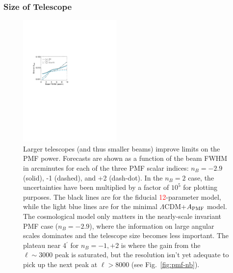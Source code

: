 \documentclass[apj]{emulateapj}
\newcommand{\apmf}{\ensuremath{A_{\rm PMF}}}
\newcommand{\lcdm}{\ensuremath{\Lambda}CDM}
\newcommand{\changed}[1]{\textcolor{Red}{#1}}
\begin{document}
\subsubsection{Size of Telescope }


\begin{figure}[htb]\centering
\includegraphics[width=0.45\textwidth,clip,trim={2.cm 12.5cm 11cm 7.5cm}]{pmf_beam.pdf}
  \caption[]{ \label{fig:beam}
 Larger telescopes (and thus smaller beams) improve limits on the PMF power. 
 Forecasts are shown as a function of the beam FWHM in arcminutes for each of the three PMF scalar indices: $n_B = -2.9$ (solid), -1 (dashed), and +2 (dash-dot). 
   In the $n_B=2$ case, the uncertainties have been multiplied by a factor of $10^5$ for plotting purposes. 
  The black lines are for the fiducial \changed{12}-parameter model, while the light blue lines are for the minimal \lcdm{}+\apmf{} model. 
  The cosmological model only matters in the nearly-scale invariant PMF case ($n_B=-2.9$), where the information on large angular scales dominates and the telescope size becomes less important. 
  The plateau near 4$^\prime$ for $n_B=-1, +2$ is where the gain from the $\ell\sim3000$ peak is saturated, but the resolution isn't yet adequate to pick up the next peak at $\ell > 8000$ (see  Fig.~\ref{fig:pmf-nb}).  
    }
\end{figure}
\end{document}

